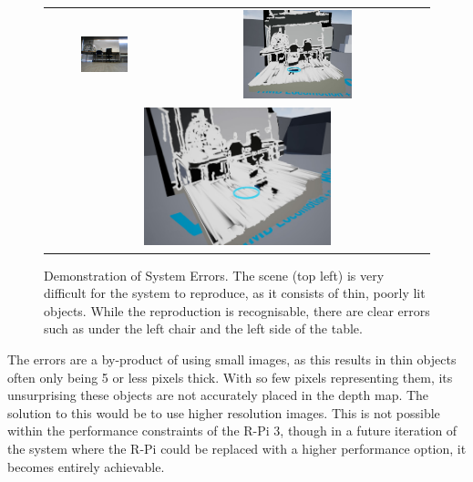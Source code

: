 \begin{figure}[H]
    \begin{center}
    \begin{tabular}{ c c }
        \includegraphics[width=0.43\textwidth,trim={0cm 0 1cm 0},clip]{Figures/TestScene3.jpg} &
        \includegraphics[width=0.43\textwidth]{Figures/TestUnreal3.jpg} \\
        \multicolumn{2}{c}{\includegraphics[width=0.5\textwidth]{Figures/TestUnreal3S.jpg}}
    \end{tabular}
    \caption[Demonstration of System Errors]{Demonstration of System Errors. The scene (top left) is very difficult for the system to reproduce, as it consists of thin, poorly lit objects. While the reproduction is recognisable, there are clear errors such as under the left chair and the left side of the table.}
    \label{fig:UErrors}
    \end{center}
\end{figure}

The errors are a by-product of using small images, as this results in thin objects often only being 5 or less pixels thick. With so few pixels representing them, its unsurprising these objects are not accurately placed in the depth map. The solution to this would be to use higher resolution images. This is not possible within the performance constraints of the R-Pi 3, though in a future iteration of the system where the R-Pi could be replaced with a higher performance option, it becomes entirely achievable.


